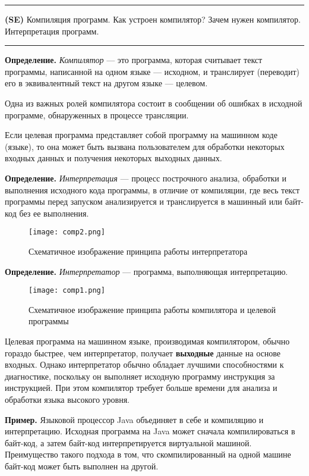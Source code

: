\documentclass[12pt]{article}
\begin{document}
\noindent\rule{\textwidth}{1pt}
\textbf{(SE)} Компиляция программ. Как устроен компилятор? Зачем нужен компилятор. Интерпретация программ.

\noindent\rule{\textwidth}{1pt}

\textbf{Определение.} \textit{Компилятор} --- это программа, которая считывает текст программы, написанной на одном языке --- исходном, и транслирует (переводит) его в эквивалентный текст на другом языке --- целевом. 

Одна из важных ролей компилятора состоит в сообщении об ошибках в исходной программе, обнаруженных в процессе трансляции.

Если целевая программа представляет собой программу на машинном коде (языке), то она может быть вызвана пользователем для обработки некоторых входных данных и получения некоторых выходных данных.

\textbf{Определение.} \textit{Интерпретация} --- процесс построчного анализа, обработки и выполнения исходного кода программы, в отличие от компиляции, где весь текст программы перед запуском анализируется и транслируется в машинный или байт-код без ее выполнения.


\begin{figure}[h]
\centering
\texttt{[image: comp2.png]}
\caption{Схематичное изображение принципа работы интерпретатора}
\label{fig:mpr}
\end{figure}

\textbf{Определение.} \textit{Интерпретатор} --- программа, выполняющая интерпретацию.


\begin{figure}
\centering
\texttt{[image: comp1.png]}
\caption{Схематичное изображение принципа работы компилятора и целевой программы}
\label{fig:mpr}
\end{figure}

Целевая программа на машинном языке, производимая компилятором, обычно гораздо быстрее, чем интерпретатор, получает \textbf{выходные} данные на основе входных. Однако интерпретатор обычно обладает лучшими способностями к диагностике, поскольку он выполняет исходную программу инструкция за инструкцией. При этом компилятор требует больше времени для анализа и обработки языка высокого уровня.

\textbf{Пример.} Языковой процессор Java объединяет в себе и компиляцию и интерпретацию. Исходная программа на Java может сначала компилироваться в байт-код, а затем байт-код интерпретируется виртуальной машиной. Преимущество такого подхода в том, что скомпилированный на одной машине байт-код может быть выполнен на другой.  
\end{document}
